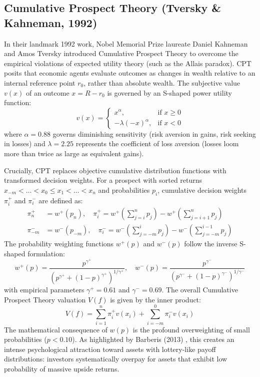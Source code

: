 \documentclass[10pt,journal,compsoc]{IEEEtran}
\begin{document}
\subsection{Cumulative Prospect Theory (Tversky \& Kahneman, 1992)}
In their landmark 1992 work, Nobel Memorial Prize laureate Daniel Kahneman and Amos Tversky introduced Cumulative Prospect Theory to overcome the empirical violations of expected utility theory (such as the Allais paradox). CPT posits that economic agents evaluate outcomes as changes in wealth relative to an internal reference point $r_0$, rather than absolute wealth. The subjective value $v(x)$ of an outcome $x = R - r_0$ is governed by an S-shaped power utility function:
\begin{equation}
v(x) = \begin{cases} 
x^\alpha, & \text{if } x \ge 0 \\ 
-\lambda (-x)^\alpha, & \text{if } x < 0 
\end{cases}
\label{eq:cpt_value}
\end{equation}
where $\alpha = 0.88$ governs diminishing sensitivity (risk aversion in gains, risk seeking in losses) and $\lambda = 2.25$ represents the coefficient of loss aversion (losses loom more than twice as large as equivalent gains).

Crucially, CPT replaces objective cumulative distribution functions with transformed decision weights. For a prospect with sorted returns $x_{-m} < \dots < x_0 \le x_1 < \dots < x_n$ and probabilities $p_i$, cumulative decision weights $\pi_i^+$ and $\pi_i^-$ are defined as:
\begin{align}
\pi_n^+ &= w^+(p_n), \quad \pi_i^+ = w^+\left(\sum_{j=i}^n p_j\right) - w^+\left(\sum_{j=i+1}^n p_j\right) \label{eq:cpt_weight_gain} \\
\pi_{-m}^- &= w^-(p_{-m}), \quad \pi_i^- = w^-\left(\sum_{j=-m}^i p_j\right) - w^-\left(\sum_{j=-m}^{i-1} p_j\right) \label{eq:cpt_weight_loss}
\end{align}
The probability weighting functions $w^+(p)$ and $w^-(p)$ follow the inverse S-shaped formulation:
\begin{equation}
w^+(p) = \frac{p^{\gamma^+}}{(p^{\gamma^+} + (1-p)^{\gamma^+})^{1/\gamma^+}}, \quad w^-(p) = \frac{p^{\gamma^-}}{(p^{\gamma^-} + (1-p)^{\gamma^-})^{1/\gamma^-}}
\label{eq:cpt_pw}
\end{equation}
with empirical parameters $\gamma^+ = 0.61$ and $\gamma^- = 0.69$. The overall Cumulative Prospect Theory valuation $V(f)$ is given by the inner product:
\begin{equation}
V(f) = \sum_{i=1}^n \pi_i^+ v(x_i) + \sum_{i=-m}^0 \pi_i^- v(x_i)
\label{eq:cpt_total}
\end{equation}
The mathematical consequence of $w(p)$ is the profound overweighting of small probabilities ($p < 0.10$). As highlighted by Barberis (2013) \cite{barberis2013thirty}, this creates an intense psychological attraction toward assets with lottery-like payoff distributions: investors systematically overpay for assets that exhibit low probability of massive upside returns.
\end{document}
